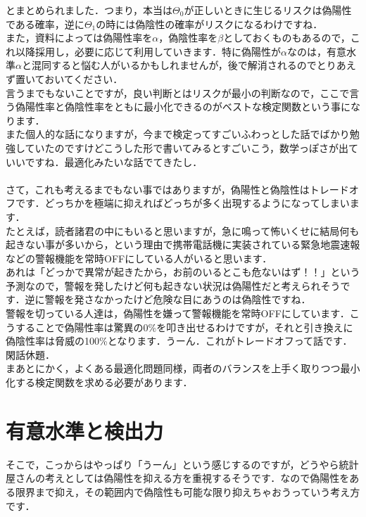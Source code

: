 \documentclass[11pt,a4paper,uplatex]{ujreport} 	%
\begin{document}
とまとめられました．つまり，本当は$\Theta_0$が正しいときに生じるリスクは偽陽性である確率，逆に$\Theta_1$の時には偽陰性の確率がリスクになるわけですね．\\

また，資料によっては偽陽性率を$\alpha$，偽陰性率を$\beta$としておくものもあるので，これ以降採用し，必要に応じて利用していきます．特に偽陽性が$\alpha$なのは，有意水準$\alpha$と混同すると悩む人がいるかもしれませんが，後で解消されるのでとりあえず置いておいてください．\\

言うまでもないことですが，良い判断とはリスクが最小の判断なので，ここで言う偽陽性率と偽陰性率をともに最小化できるのがベストな検定関数という事になります．\\

また個人的な話になりますが，今まで検定ってすごいふわっとした話でばかり勉強していたのですけどこうした形で書いてみるとすごいこう，数学っぽさが出ていいですね．最適化みたいな話でてきたし．\\\\

さて，これも考えるまでもない事ではありますが，偽陽性と偽陰性はトレードオフです．どっちかを極端に抑えればどっちが多く出現するようになってしまいます．\\

たとえば，読者諸君の中にもいると思いますが，急に鳴って怖いくせに結局何も起きない事が多いから，という理由で携帯電話機に実装されている緊急地震速報などの警報機能を常時OFFにしている人がいると思います．\\

あれは「どっかで異常が起きたから，お前のいるとこも危ないはず！！」という予測なので，警報を発したけど何も起きない状況は偽陽性だと考えられそうです．逆に警報を発さなかったけど危険な目にあうのは偽陰性ですね．\\

警報を切っている人達は，偽陽性を嫌って警報機能を常時OFFにしています．こうすることで偽陽性率は驚異の0\%を叩き出せるわけですが，それと引き換えに偽陰性率は脅威の100\%となります．うーん．これがトレードオフって話です．\\

閑話休題．\\

まあとにかく，よくある最適化問題同様，両者のバランスを上手く取りつつ最小化する検定関数を求める必要があります．\\

\section{有意水準と検出力}
そこで，こっからはやっぱり「うーん」という感じするのですが，どうやら統計屋さんの考えとしては偽陽性を抑える方を重視するそうです．なので偽陽性をある限界まで抑え，その範囲内で偽陰性も可能な限り抑えちゃおうっていう考え方です．\\
\end{document}
